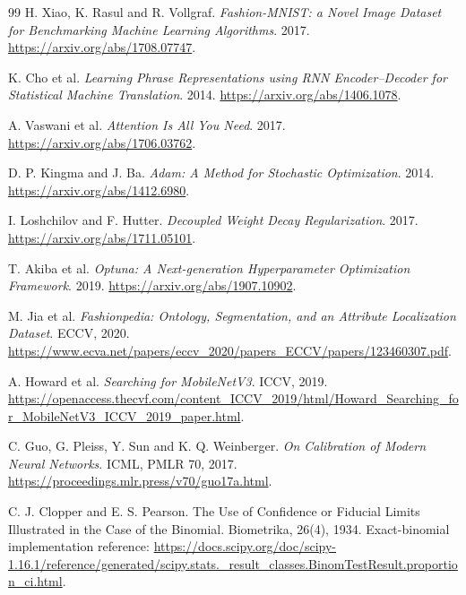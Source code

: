 \clearpage

\clearpage
\begin{thebibliography}{99}
H. Xiao, K. Rasul and R. Vollgraf.
\emph{Fashion-MNIST: a Novel Image Dataset for Benchmarking Machine Learning Algorithms}. 2017.
\url{https://arxiv.org/abs/1708.07747}.

K. Cho et al.
\emph{Learning Phrase Representations using RNN Encoder--Decoder for Statistical Machine Translation}. 2014.
\url{https://arxiv.org/abs/1406.1078}.

A. Vaswani et al.
\emph{Attention Is All You Need}. 2017.
\url{https://arxiv.org/abs/1706.03762}.

D. P. Kingma and J. Ba.
\emph{Adam: A Method for Stochastic Optimization}. 2014.
\url{https://arxiv.org/abs/1412.6980}.

I. Loshchilov and F. Hutter.
\emph{Decoupled Weight Decay Regularization}. 2017.
\url{https://arxiv.org/abs/1711.05101}.

T. Akiba et al.
\emph{Optuna: A Next-generation Hyperparameter Optimization Framework}. 2019.
\url{https://arxiv.org/abs/1907.10902}.

M. Jia et al.
\emph{Fashionpedia: Ontology, Segmentation, and an Attribute Localization Dataset}. ECCV, 2020.
\url{https://www.ecva.net/papers/eccv_2020/papers_ECCV/papers/123460307.pdf}.

A. Howard et al.
\emph{Searching for MobileNetV3}. ICCV, 2019.
\url{https://openaccess.thecvf.com/content_ICCV_2019/html/Howard_Searching_for_MobileNetV3_ICCV_2019_paper.html}.

C. Guo, G. Pleiss, Y. Sun and K. Q. Weinberger.
\emph{On Calibration of Modern Neural Networks}. ICML, PMLR 70, 2017.
\url{https://proceedings.mlr.press/v70/guo17a.html}.

C. J. Clopper and E. S. Pearson. The Use of Confidence or Fiducial Limits Illustrated in the Case of the Binomial. Biometrika, 26(4), 1934. Exact-binomial implementation reference: \url{https://docs.scipy.org/doc/scipy-1.16.1/reference/generated/scipy.stats._result_classes.BinomTestResult.proportion_ci.html}.
\end{thebibliography}

